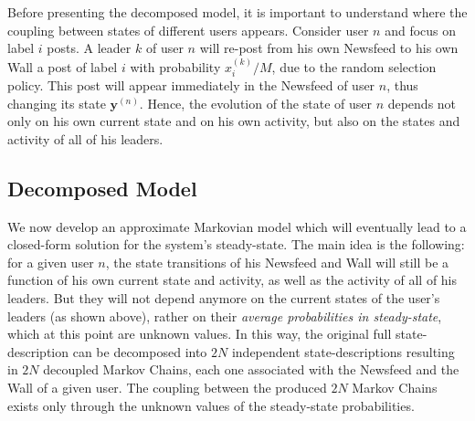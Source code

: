 \documentclass[10pt, conference, letterpaper]{IEEEtran}
\begin{document}
Before presenting the decomposed model, it is important to understand where the coupling between states of different users appears. Consider user $n$ and focus on label $i$ posts. A leader $k$ of user $n$ will re-post from his own Newsfeed to his own Wall a post of label $i$ with probability $x_i^{(k)}/M$, due to the random selection policy. This post will appear immediately in the Newsfeed of user $n$, thus changing its state $\mathbf{y}^{(n)}$. Hence, the evolution of the state of user $n$ depends not only on his own current state and on his own activity, but also on the states and activity of all of his leaders.

\subsection{Decomposed Model}
\label{DetMod}

We now develop an approximate Markovian model which will eventually lead to a closed-form solution for the system's steady-state. The main idea is the following: for a given user $n$, the state transitions of his Newsfeed and Wall will still be a function of his own current state and activity, as well as the activity of all of his leaders. But they will not depend anymore on the current states of the user's leaders (as shown above), rather on their \textit{average probabilities in steady-state}, which at this point are unknown values.
In this way, the original full state-description can be decomposed into $2N$ independent state-descriptions resulting in $2N$ decoupled 
Markov Chains, each one associated with the Newsfeed and the Wall of a given user. The coupling between the produced $2N$ Markov Chains exists only through the unknown values of the steady-state probabilities.%

\end{document}
